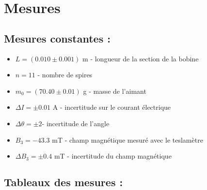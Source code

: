 \documentclass[12pt,a4paper]{article}
\begin{document}
    \section{Mesures}
    \subsection{Mesures constantes :}
    \begin{itemize}
        \item $L = (0.010 \pm 0.001)$ m - longueur de la section de la bobine
        \item $n = 11$ - nombre de spires
        \item $m_0 = (70.40 \pm 0.01)$ g - masse de l'aimant
        \item $\Delta I = \pm 0.01$ A - incertitude sur le courant électrique
        \item $\Delta \theta = \pm 2$\textdegree - incertitude de l'angle
        \item $B_3 = -43.3$ mT - champ magnétique mesuré avec le teslamètre
        \item $\Delta B_3 = \pm 0.4$ mT - incertitude du champ magnétique
    \end{itemize}
    \subsection{Tableaux des mesures :}
\end{document}
